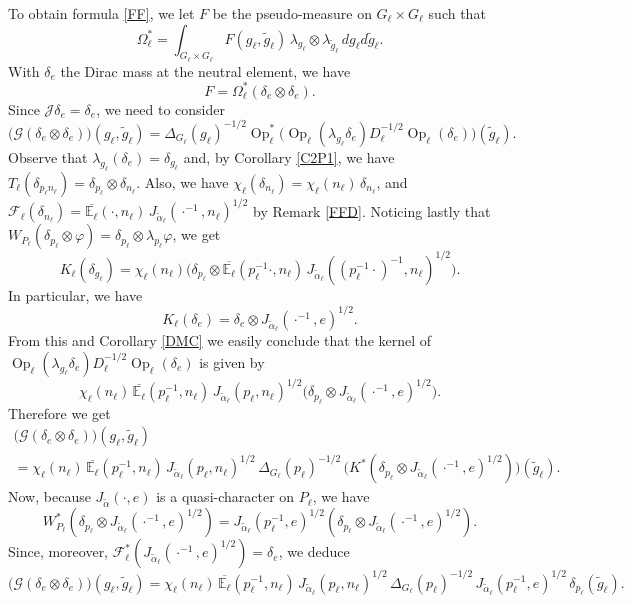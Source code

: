 \documentclass[a4paper,11pt,reqno]{amsart}
\numberwithin{equation}{section}
\theoremstyle{remark}
\theoremstyle{definition}
\newcommand\Op{\operatorname{Op}}
\newcommand{\G}{{\mathcal G}}
\newcommand{\CJ}{\mathcal J}
\newcommand{\CF}{\mathcal F}
\newcommand{\E}{\mathbb E}
\newcommand{\vf}{\varphi}
\begin{document}
To obtain formula \eqref{FF}, we let $F$  be the  pseudo-measure on $G_\ell\times G_\ell$ such that
$$
\Omega_\ell^*=\int_{G_\ell\times G_\ell} F(g_\ell,\tilde g_\ell)\,\lambda_{g_\ell}\otimes \lambda_{\tilde g_\ell}\, dg_\ell d\tilde g_\ell.
$$
With $\delta_e$ the Dirac mass at the neutral element, we have
$$
F=\Omega_\ell^*(\delta_e\otimes \delta_e).
$$
Since $\CJ\delta_e=\delta_e$, we need to consider
$$
\big(\G(\delta_e\otimes \delta_e)\big)(g_\ell,\tilde g_\ell)
=
\Delta_{G_\ell}(g_\ell)^{-1/2}\Op_\ell^*\big(\Op_\ell(\lambda_{g_\ell}\delta_e)D_\ell^{-1/2}\Op_\ell(\delta_e)\big)(\tilde g_\ell).
$$
Observe that $\lambda_{g_\ell}(\delta_e)=\delta_{g_\ell}$ and, by Corollary \ref{C2P1}, we have $T_\ell (\delta_{p_\ell n_\ell})=\delta_{p_\ell}\otimes \delta_{n_\ell}$. Also, we have
$\chi_\ell(\delta_{n_\ell})=\chi_\ell(n_\ell)\,\delta_{n_\ell}$, and
$\CF_\ell(\delta_{n_\ell})=\overline{\E_\ell}(\cdot ,n_\ell)\, J_{\tilde\alpha_\ell}(\cdot^{-1},n_\ell)^{1/2}$ by Remark \ref{FFD}.
Noticing lastly that $W_{P_\ell}(\delta_{p_\ell}\otimes\vf)=\delta_{p_\ell}\otimes\lambda_{p_\ell}\vf$, we get
$$
K_\ell(\delta_{g_\ell})=\chi_\ell(n_\ell)\big(\delta_{p_\ell}\otimes \overline{\E_\ell}(p_\ell^{-1}\cdot ,n_\ell)\, J_{\tilde\alpha_\ell}((p_\ell^{-1}\cdot)^{-1},n_\ell)^{1/2}\big).
$$
In particular, we have
$$
K_\ell(\delta_{e})=\delta_{e}\otimes  J_{\tilde\alpha_\ell}(\cdot^{-1},e)^{1/2}.
$$
From this and Corollary \ref{DMC} we easily conclude that the kernel  of $\Op_\ell(\lambda_{g_\ell}\delta_e)D_\ell^{-1/2}\Op_\ell(\delta_e)$ is given by
$$
\chi_\ell(n_\ell)\,\overline{\E_\ell}(p_\ell^{-1},n_\ell)\, J_{\tilde\alpha_\ell}(p_\ell,n_\ell)^{1/2}\big(\delta_{p_\ell}\otimes
J_{\tilde\alpha_\ell}(\cdot^{-1},e)^{1/2}\big).
$$
Therefore we get
\begin{multline*}
\big(\G(\delta_e\otimes \delta_e)\big)(g_\ell,\tilde g_\ell)\\
=\chi_\ell(n_\ell)\,\overline{\E_\ell}(p_\ell^{-1},n_\ell)\, J_{\tilde\alpha_\ell}(p_\ell,n_\ell)^{1/2}\,
\Delta_{G_\ell}(p_\ell)^{-1/2}\, \big(K^*(\delta_{p_\ell}\otimes J_{\tilde\alpha_\ell}(\cdot^{-1},e)^{1/2})\big)(\tilde g_\ell).
\end{multline*}
Now, because $J_{\tilde\alpha}(\cdot,e)$ is a quasi-character on $P_\ell$, we have
$$
W^*_{P_\ell}(\delta_{p_\ell}\otimes J_{\tilde\alpha_\ell}(\cdot^{-1},e)^{1/2})=J_{\tilde\alpha_\ell}(p_\ell^{-1},e)^{1/2}(\delta_{p_\ell}\otimes J_{\tilde\alpha_\ell}(\cdot^{-1},e)^{1/2}).
$$
Since, moreover, $\CF_\ell^*(  J_{\tilde\alpha_\ell}(\cdot^{-1},e)^{1/2})=\delta_e$, we deduce
$$
\big(\G(\delta_e\otimes \delta_e)\big)(g_\ell,\tilde g_\ell)=\chi_\ell(n_\ell)\,\overline{\E_\ell}(p_\ell^{-1},n_\ell)\, J_{\tilde\alpha_\ell}(p_\ell,n_\ell)^{1/2}\,
\Delta_{G_\ell}(p_\ell)^{-1/2}\, J_{\tilde\alpha_\ell}(p_\ell^{-1},e)^{1/2}\,\delta_{p_\ell}(\tilde g_\ell).
$$
\end{document}
